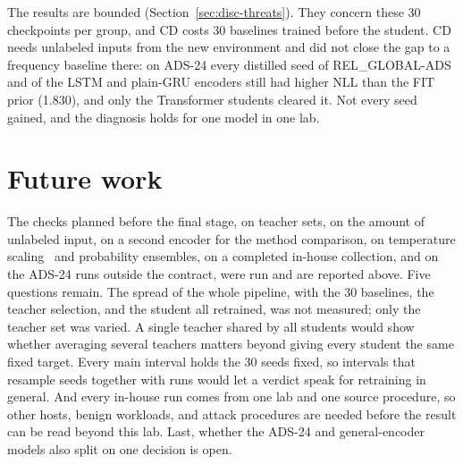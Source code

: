 The results are bounded (Section~\ref{sec:disc-threats}). They concern
these 30 checkpoints per group, and CD costs 30 baselines trained before
the student. CD needs unlabeled inputs from the new environment and did
not close the gap to a frequency baseline there: on ADS-24 every
distilled seed of REL\_GLOBAL-ADS and of the LSTM and plain-GRU encoders
still had higher NLL than the FIT prior (1.830), and only the
Transformer students cleared it. Not every seed gained, and the
diagnosis holds for one model in one lab.

\section{Future work}
\label{sec:future}

The checks planned before the final stage, on teacher sets, on the
amount of unlabeled input, on a second encoder for the method
comparison, on temperature scaling~\cite{guo2017calibration} and
probability ensembles, on a completed in-house collection, and on the
ADS-24 runs outside the contract, were run and are reported above.
Five questions remain. The spread of the whole pipeline, with the 30
baselines, the teacher selection, and the student all retrained, was
not measured; only the teacher set was varied. A single teacher shared
by all students would show whether averaging several teachers matters
beyond giving every student the same fixed target. Every main interval
holds the 30 seeds fixed, so intervals that resample seeds together with
runs would let a verdict speak for retraining in general. And every
in-house run comes from one lab and one source procedure, so other
hosts, benign workloads, and attack procedures are needed before the
result can be read beyond this lab.
Last, whether the ADS-24 and general-encoder models also split on one
decision is open.


